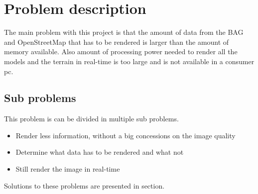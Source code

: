 \chapter{Problem description}
\label{chapter:ProblemDescription}
The main problem with this project is that the amount of data from the BAG and OpenStreetMap that has to be rendered is larger than the amount of memory available. Also amount of processing power needed to render all the models and the terrain in real-time is too large and is not available in a consumer pc.

\section{Sub problems}
\label{chapter:SubProblems}
This problem is can be divided in multiple sub problems.
\begin{itemize}
   \item Render less information, without a big concessions on the image quality
   \item Determine what data has to be rendered and what not
   \item Still render the image in real-time
\end{itemize}
Solutions to these problems are presented in section. 